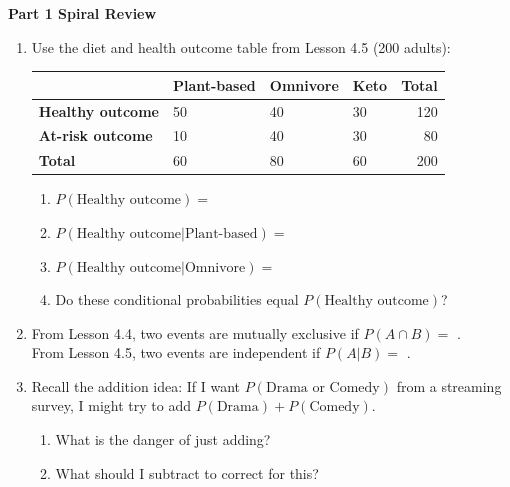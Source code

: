 \documentclass[10pt]{article}
\begin{document}
\namedateperiod

\vspace{0.3in}

{\large\bfseries\color{navy} Part 1 \quad Spiral Review}

\vspace{0.12in}

\begin{enumerate}

    \item Use the diet and health outcome table from Lesson 4.5 (200 adults):

    \vspace{6pt}
    \renewcommand{\arraystretch}{1.4}
    \begin{tabularx}{\linewidth}{@{} l X X X r @{}}
     & \textbf{Plant-based} & \textbf{Omnivore} & \textbf{Keto} & \textbf{Total} \\
    \hline
    \textbf{Healthy outcome}  & 50 & 40 & 30 & 120 \\
    \textbf{At-risk outcome}  & 10 & 40 & 30 & 80 \\
    \hline
    \textbf{Total}            & 60 & 80 & 60 & 200 \\
    \end{tabularx}
    \vspace{6pt}
    \begin{enumerate}[label=(\alph*), itemsep=6pt]
        \item $P(\text{Healthy outcome}) = $ \blank{4cm}
        \item $P(\text{Healthy outcome} | \text{Plant-based}) = $ \blank{4cm}
        \item $P(\text{Healthy outcome} | \text{Omnivore}) = $ \blank{4cm}
        \item Do these conditional probabilities equal $P(\text{Healthy outcome})$?
              \blank{3cm}
    \end{enumerate}

    \vspace{0.16in}

    \item From Lesson 4.4, two events are mutually exclusive if $P(A \cap B) = $ \blank{2cm}.\\
    From Lesson 4.5, two events are independent if $P(A|B) = $ \blank{2cm}.

    \vspace{0.16in}

    \item Recall the addition idea: If I want $P(\text{Drama or Comedy})$ from a streaming
    survey, I might try to add $P(\text{Drama}) + P(\text{Comedy})$.
    \begin{enumerate}[label=(\alph*), itemsep=6pt]
        \item What is the danger of just adding? \writeline
        \item What should I subtract to correct for this? \blank{4cm}
    \end{enumerate}

\end{enumerate}
\end{document}
